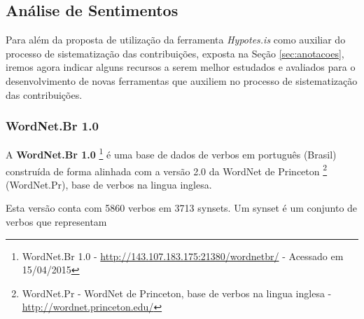 \subsection{Análise de Sentimentos\label{subsec:analise-sentimentos}}
Para além da proposta de utilização da ferramenta \textit{Hypotes.is} como auxiliar do processo de sistematização das contribuições, exposta na Seção \ref{sec:anotacoes}, iremos agora indicar alguns recursos a serem melhor estudados e avaliados para o desenvolvimento de novas ferramentas que auxiliem no processo de sistematização das contribuições.

\subsubsection{WordNet.Br 1.0}
A \textbf{WordNet.Br 1.0}%
\footnote{WordNet.Br 1.0 - \url{http://143.107.183.175:21380/wordnetbr/} - Acessado em 15/04/2015}
é uma base de dados de verbos em português (Brasil) construída de forma alinhada com a versão 2.0 da WordNet de Princeton%
\footnote{WordNet.Pr - WordNet de Princeton, base de verbos na lingua inglesa - \url{http://wordnet.princeton.edu/}} (WordNet.Pr), base de verbos na lingua inglesa.


Esta versão conta com 5860 verbos em 3713 \glspl{synset}. Um \gls{synset} é um conjunto de verbos que representam 